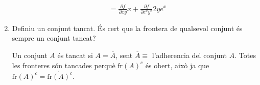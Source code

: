 \documentclass[a4paper, 12pt]{article}
\begin{document}
\begin{exercici}
\begin{enumerate}[label=\alph*)]
\begin{solucio}
\begin{displaymath}
\begin{split}
                        &= \frac{\partial f}{\partial xy}x + \frac{\partial f}{\partial e^xy^2}2ye^x                        
                    \end{split}
                \end{displaymath}
            \end{solucio}
            \item Definiu un conjunt tancat. És cert que la frontera de qualsevol conjunt és sempre
            un conjunt tancat?\\
            \begin{solucio}
                Un conjunt $A$ és tancat si $A = \overline{A}$, sent $\overline{A} \equiv$
                l'adherencia del conjunt $A$. Totes les fronteres són tancades perquè $\text{fr}(A)^c$
                és obert, això ja que $\text{fr}(A)^c = \mathring{\text{fr}(A)^c}$.
            \end{solucio}
        \end{enumerate}
    \end{exercici}
\end{document}
